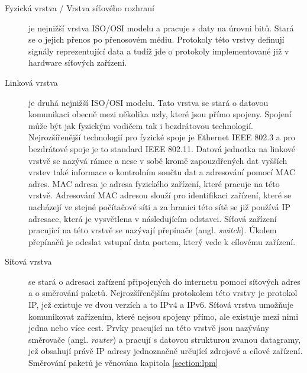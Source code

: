 \begin{description}
\item[Fyzická vrstva / Vrstva síťového rozhraní]\label{layers:physical} %
je nejnižší vrstva ISO/OSI modelu a pracuje s daty na úrovni bitů. Stará se o
jejich přenos po přenosovém médiu. Protokoly této vrstvy definují signály reprezentující data
a tudíž jde o protokoly implementované již v hardware síťových zařízení.

\item[Linková vrstva]\label{layers:link} %
je druhá nejnižší ISO/OSI modelu. Tato vrstva se stará o datovou komunikaci
obecně mezi několika uzly, které jsou přímo spojeny. Spojení může být jak fyzickým vodičem tak i
bezdrátovou technologií. Nejrozšířenější technologií pro fyzické spoje je Ethernet IEEE 802.3 a pro bezdrátové spoje
je to standard IEEE 802.11. Datová jednotka na linkové vrstvě se nazývá rámec a nese v sobě kromě
zapouzdřených dat vyšších vrstev také informace o kontrolním součtu dat a adresování pomocí MAC adres.
MAC adresa je adresa fyzického zařízení, které pracuje na této vrstvě.
Adresování MAC adresou slouží pro identifikaci zařízení, které se nacházejí ve stejné počítačové síti
a za hranici této sítě se již používá IP adresace, která je vysvětlena v následujícím odstavci.
Síťová zařízení pracující na této vrstvě se nazývají přepínače (angl. \textit{switch}).
Úkolem přepínačů je odeslat vstupní data portem, který vede k cílovému zařízení.

\item[Síťová vrstva]\label{layers:network} %
se stará o adresaci zařízení připojených do internetu pomocí síťových adres a o směrování paketů.
Nejrozšířenějším protokolem této vrstvy je protokol IP, jež existuje ve dvou verzích a to IPv4 a IPv6.
Síťová vrstva umožňuje komunikovat zařízením, které nejsou spojeny přímo, ale existuje mezi nimi jedna nebo více cest.
Prvky pracující na této vrstvě jsou nazývány směrovače (angl. \textit{router}) a pracují s datovou strukturou zvanou
datagramy, jež obsahují právě IP adresy jednoznačně určující zdrojové a cílové zařízení. Směrování paketů
je věnována kapitola \ref{section:lpm}


\end{description}
